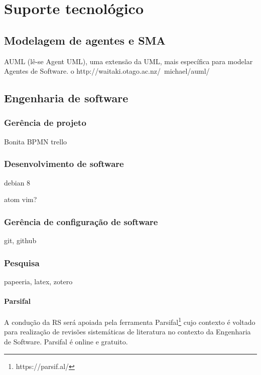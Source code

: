 \chapter[Suporte tecnológico]{Suporte tecnológico}\label{ch:suporte}

\section{Modelagem de agentes e SMA}



AUML (lê-se Agent UML), uma extensão da UML,
mais específica para modelar Agentes de Software.
o http://waitaki.otago.ac.nz/~michael/auml/



\section{Engenharia de software}

\subsection{Gerência de projeto}

Bonita BPMN
trello

\subsection{Desenvolvimento de software}

debian 8

atom
vim?

\subsection{Gerência de configuração de software}

git, github

\subsection{Pesquisa}

papeeria, latex, zotero

\subsubsection{Parsifal}

A condução da RS será apoiada pela ferramenta Parsifal\footnote{https://parsif.al/} cujo contexto é voltado para realização de revisões sistemáticas de literatura no contexto da Engenharia de Software. Parsifal é online e gratuito.



